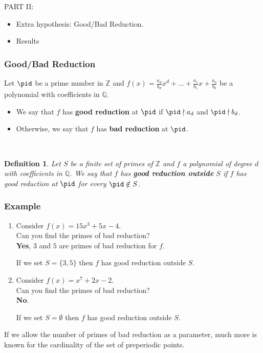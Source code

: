 \documentclass{beamer}
\def\jump{ \quad \\ \vspace{0.7cm} \pause}
\def\QQ{{\mathbb Q}}
\def\ZZ{{\mathbb Z}}
\theoremstyle{thmstyle}
\newtheorem*{mydef}{Definition}
\theoremstyle{thmstyle}
\theoremstyle{thmstyle}
\theoremstyle{mystyle}
\theoremstyle{qstnstyle}
\begin{document}
\begin{frame}
PART II:
\begin{itemize}
\item Extra hypothesis: Good/Bad Reduction.
\item Results
\end{itemize}
\end{frame}

\begin{frame}
\frametitle{Good/Bad Reduction}
Let $\pid$ be a prime number in $\ZZ$ and $f(x)=\frac{a_d}{b_d}x^d+\ldots+\frac{a_1}{b_1}x+\frac{a_0}{b_0}$ be a polynomial with coefficients in $\QQ$.

\pause \vspace{8mm}
\begin{itemize}
\item We say that $f$ has \textbf{good reduction} at $\pid$ if $\pid \nmid a_d$ and $\pid \nmid b_d$.
\pause \vspace{5mm}
\item Otherwise, we say that $f$ has \textbf{bad reduction} at $\pid$.
\end{itemize}
\jump
\begin{mydef}
Let $S$ be a finite set of primes of $\ZZ$ and $f$ a polynomial of degree $d$ with coefficients in $\QQ$. We say that $f$ has \textbf{good reduction outside } $S$ if $f$ has good reduction at $\pid$ for every $\pid\notin S$.
\end{mydef}
\end{frame}

\begin{frame}
\frametitle{Example}
\begin{enumerate}
\item Consider $f(x)=15x^3+5x-4$.\\
Can you find the primes of bad reduction?\\ \pause \textbf{Yes}, $3$ and $5$ are primes of bad reduction for $f$.
\vspace{3mm}

If we set $S=\{3,5\}$ then $f$ has good reduction outside $S$.

\pause \vspace{5mm}
\item Consider $f(x)=x^7+2x-2$.\\
Can you find the primes of bad reduction?\\ \pause \textbf{No}. 

If we set $S=\emptyset$ then $f$ has good reduction outside $S$.
\end{enumerate}
\pause \vspace{5mm}

If we allow the number of primes of bad reduction as a parameter, much more is known for the cardinality of the set of preperiodic points. 
\end{frame}
\end{document}
